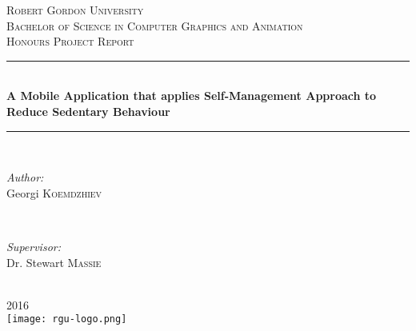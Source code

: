 \begin{titlepage}
  \newcommand{\HRule}{\rule{\linewidth}{0.5mm}}
  \center

  \textsc{\LARGE Robert Gordon University}\\[1.5cm]
  \textsc{\Large Bachelor of Science in Computer Graphics and Animation}\\[0.5cm]
  \textsc{\large Honours Project Report}\\[0.5cm]

  \HRule \\[0.4cm]
  { \huge \bfseries A Mobile Application that applies Self-Management Approach to Reduce Sedentary Behaviour}\\[0.4cm]
  \HRule \\[1.5cm]

  \begin{minipage}{0.4\textwidth}
  \begin{flushleft} \large
  \emph{Author:}\\
  Georgi \textsc{Koemdzhiev}
  \end{flushleft}
  \end{minipage}
  ~
  \begin{minipage}{0.4\textwidth}
  \begin{flushright} \large
  \emph{Supervisor:} \\
  Dr. Stewart \textsc{Massie}
  \end{flushright}
  \end{minipage}\\[4cm]

  {\large 2016}\\[3cm]

  \texttt{[image: rgu-logo.png]}\\[1cm]
  \vfill
\end{titlepage}